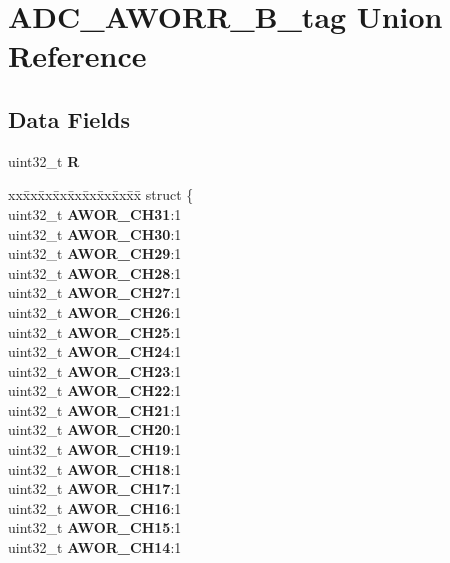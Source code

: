 \hypertarget{unionADC__AWORR__32B__tag}{}\section{A\+D\+C\+\_\+\+A\+W\+O\+R\+R\+\_\+B\+\_\+tag Union Reference}
\label{unionADC__AWORR__32B__tag}
\subsection*{Data Fields}
\begin{DoxyCompactItemize}
\item 
\mbox{\label{unionADC__AWORR__32B__tag_aebb06884d05418a80756338d84b97f00}} 
uint32\+\_\+t {\bfseries R}
\item 
\mbox{\label{unionADC__AWORR__32B__tag_a13e8f855f80ccba25c2205cb20fe8041}} 
\begin{tabbing}
xx\=xx\=xx\=xx\=xx\=xx\=xx\=xx\=xx\=\kill
struct \{\\
\>uint32\_t {\bfseries AWOR\_CH31}:1\\
\>uint32\_t {\bfseries AWOR\_CH30}:1\\
\>uint32\_t {\bfseries AWOR\_CH29}:1\\
\>uint32\_t {\bfseries AWOR\_CH28}:1\\
\>uint32\_t {\bfseries AWOR\_CH27}:1\\
\>uint32\_t {\bfseries AWOR\_CH26}:1\\
\>uint32\_t {\bfseries AWOR\_CH25}:1\\
\>uint32\_t {\bfseries AWOR\_CH24}:1\\
\>uint32\_t {\bfseries AWOR\_CH23}:1\\
\>uint32\_t {\bfseries AWOR\_CH22}:1\\
\>uint32\_t {\bfseries AWOR\_CH21}:1\\
\>uint32\_t {\bfseries AWOR\_CH20}:1\\
\>uint32\_t {\bfseries AWOR\_CH19}:1\\
\>uint32\_t {\bfseries AWOR\_CH18}:1\\
\>uint32\_t {\bfseries AWOR\_CH17}:1\\
\>uint32\_t {\bfseries AWOR\_CH16}:1\\
\>uint32\_t {\bfseries AWOR\_CH15}:1\\
\>uint32\_t {\bfseries AWOR\_CH14}:1\\

\end{tabbing}
\end{DoxyCompactItemize}
